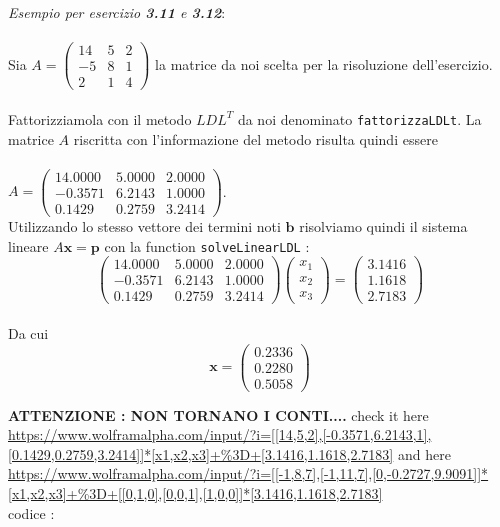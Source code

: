 \textit{Esempio per esercizio \textbf{3.11} e \textbf{3.12}}: \\ \\ 
Sia
\( A = 
\begin{pmatrix}
  14 & 5 & 2 \\
  -5 & 8 & 1\\
  2 & 1 & 4
 \end{pmatrix}
\) la matrice da noi scelta per la risoluzione dell'esercizio. \\ \\ Fattorizziamola con il metodo $LDL^T$ da noi denominato \texttt{fattorizzaLDLt}. La matrice $A$ riscritta con l'informazione del metodo risulta quindi essere \\ \\ \( A = 
\begin{pmatrix}
  14.0000 & 5.0000 & 2.0000 \\
  -0.3571 & 6.2143 & 1.0000\\
  0.1429 & 0.2759 & 3.2414
 \end{pmatrix}
\). \\
Utilizzando lo stesso vettore dei termini noti $\mathbf{b}$ risolviamo quindi il sistema lineare $A\mathbf{x} = \mathbf{p}$ con la function \texttt{solveLinearLDL} : 
\[
\begin{pmatrix}
  14.0000 & 5.0000 & 2.0000 \\
  -0.3571 & 6.2143 & 1.0000\\
  0.1429 & 0.2759 & 3.2414
 \end{pmatrix} \begin{pmatrix}x_1\\x_2\\x_3\end{pmatrix} = \begin{pmatrix}3.1416\\1.1618\\2.7183\end{pmatrix}
\] \\ 
Da cui 
\[
\mathbf{x} = \begin{pmatrix}0.2336\\0.2280\\0.5058\end{pmatrix}
\]

\textbf{ATTENZIONE : NON TORNANO I CONTI....} check it here \url{https://www.wolframalpha.com/input/?i=[[14,5,2],[-0.3571,6.2143,1],[0.1429,0.2759,3.2414]]*[x1,x2,x3]+%3D+[3.1416,1.1618,2.7183]} and here \url{https://www.wolframalpha.com/input/?i=[[-1,8,7],[-1,11,7],[0,-0.2727,9.9091]]*[x1,x2,x3]+%3D+[[0,1,0],[0,0,1],[1,0,0]]*[3.1416,1.1618,2.7183]} \\ codice :

